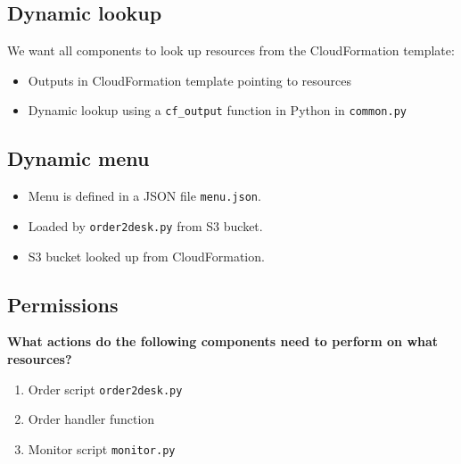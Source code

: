 \documentclass[slides]{pgnotes}
\begin{document}

\subsection{Dynamic lookup}

We want all components to look up resources from the CloudFormation template:
\begin{itemize}
\item Outputs in CloudFormation template pointing to resources
\item Dynamic lookup using a \texttt{cf\_output} function in Python in \texttt{common.py}
\end{itemize}

\subsection{Dynamic menu}

\begin{itemize}
\item Menu is defined in a JSON file \texttt{menu.json}.
\item Loaded by \texttt{order2desk.py} from S3 bucket.
\item S3 bucket looked up from CloudFormation. 
\end{itemize}

\subsection{Permissions}

\begin{center}
  \textbf{What actions do the following components need to perform on what resources?}
\end{center}

\begin{enumerate}
\item Order script \texttt{order2desk.py}
\item Order handler function
\item Monitor script \texttt{monitor.py}
\end{enumerate}
\end{document}
